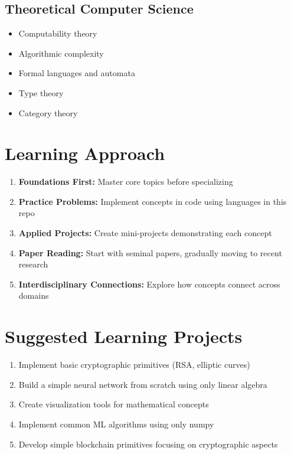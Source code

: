 \documentclass{article}
\begin{document}
\subsection{Theoretical Computer Science}
\begin{itemize}[leftmargin=*]
    \item Computability theory
    \item Algorithmic complexity
    \item Formal languages and automata
    \item Type theory
    \item Category theory
\end{itemize}

\section{Learning Approach}

\begin{enumerate}
    \item \textbf{Foundations First:} Master core topics before specializing
    \item \textbf{Practice Problems:} Implement concepts in code using languages in this repo
    \item \textbf{Applied Projects:} Create mini-projects demonstrating each concept
    \item \textbf{Paper Reading:} Start with seminal papers, gradually moving to recent research
    \item \textbf{Interdisciplinary Connections:} Explore how concepts connect across domains
\end{enumerate}

\section{Suggested Learning Projects}

\begin{enumerate}
    \item Implement basic cryptographic primitives (RSA, elliptic curves)
    \item Build a simple neural network from scratch using only linear algebra
    \item Create visualization tools for mathematical concepts
    \item Implement common ML algorithms using only numpy
    \item Develop simple blockchain primitives focusing on cryptographic aspects
\end{enumerate}
\end{document}
